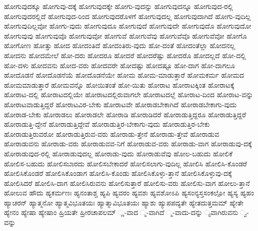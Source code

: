 {ಹೋಗುವುದಕ್ಕೂ
ಹೋಗುವು-ದಕ್ಕೆ
ಹೋಗುವುದಕ್ಕೇ
ಹೋಗು-ವುದನ್ನು
ಹೋಗುವುದನ್ನೂ
ಹೋಗುವುದ-ರಲ್ಲಿ
ಹೋಗುವುದರಲ್ಲಿದೆ
ಹೋಗುವುದ-ರಿಂದ
ಹೋಗುವುದರೊಳಗೆ
ಹೋಗುವುದಲ್ಲ
ಹೋಗುವುದಾಗಿದೆ
ಹೋಗು-ವುದಿಲ್ಲ
ಹೋಗುವುದಿಲ್ಲವೋ
ಹೋಗು-ವುದು
ಹೋಗುವುದೂ
ಹೋಗುವುದೆ
ಹೋಗುವುದೇ
ಹೋಗುವುದೊ
ಹೋಗುವುದೋ
ಹೋಗುವುವು
ಹೋಗುವುವೊ
ಹೋಗುವುವೋ
ಹೋಗುವೆ
ಹೋಗುವೆವು
ಹೋಗುವೆವೊ
ಹೋಗುವೆವೋ
ಹೋಗೊ
ಹೋಗೋಣ
ಹೋತ್ತು
ಹೋದ
ಹೋದಂತಿದೆ
ಹೋದಂತಿರು-ವುದು
ಹೋ-ದಂತೆ
ಹೋದಂತೆಲ್ಲಾ
ಹೋದನಲ್ಲ
ಹೋದನು
ಹೋದಮೇಲೆ
ಹೋ-ದರು
ಹೋದರೂ
ಹೋದರೆ
ಹೋದರೆಷ್ಟು
ಹೋದರೊ
ಹೋದಲ್ಲದೆ
ಹೋ-ದಲ್ಲಿ
ಹೋ-ದಳು
ಹೋದವನು
ಹೋದ-ವರು
ಹೋದವರೇ
ಹೋದಷ್ಟು
ಹೋದಷ್ಟೂ
ಹೋ-ದಾಗ
ಹೋ-ದಾಗಲೂ
ಹೋದೊಡನೆ
ಹೋದೊಡನೆಯೆ
ಹೋದೊಡನೆಯೇ
ಹೋಮ
ಹೋಮ-ಮಾಡುತ್ತಾರೆ
ಹೋಮಕರ್ಮ
ಹೋಮದ
ಹೋಮಮಾಡುತ್ತಾರೆ
ಹೋಮವನ್ನೊ
ಹೋಯಿತಂತೆ
ಹೋ-ಯಿತು
ಹೋರಾಟ
ಹೋರಾಟಕ್ಕಿಂತ
ಹೋರಾಟಕ್ಕೆ
ಹೋರಾಟ-ದಲ್ಲಿ
ಹೋರಾಟದಲ್ಲಿಯೇ
ಹೋರಾಟದಲ್ಲಿರುವಾಗಲೇ
ಹೋರಾಟದಲ್ಲೆ
ಹೋರಾಟ-ದಿಂದ
ಹೋರಾಟ-ವನ್ನು
ಹೋರಾಟವಾಡುತ್ತಿದ್ದರೆ
ಹೋರಾಟವಿರ-ಬೇಕು
ಹೋರಾಟವೇ
ಹೋರಾಡಬೇಕಾಗಿದೆ
ಹೋರಾಡಬೇಕಾಗು-ವುದು
ಹೋರಾಡ-ಬೇಕು
ಹೋರಾಡಲು
ಹೋರಾಡಲೇ
ಹೋರಾಡಿ
ಹೋರಾಡಿದರೆ
ಹೋರಾಡುತ್ತಿದ್ದರೂ
ಹೋರಾಡುತ್ತಿದ್ದರೆ
ಹೋರಾಡುತ್ತಿ-ದ್ದೇನೆ
ಹೋರಾಡುತ್ತಿದ್ದೇವೆ
ಹೋರಾಡುತ್ತಿರ-ಬೇಕಾಗು-ವುದು
ಹೋರಾಡುತ್ತಿರ-ಬೇಕು
ಹೋರಾಡುತ್ತಿರುವರೋ
ಹೋರಾಡುತ್ತಿರುವ-ವರು
ಹೋರಾಡು-ತ್ತೇನೆ
ಹೋರಾಡು-ತ್ತೇವೆ
ಹೋರಾಡುವ
ಹೋರಾಡುವನು
ಹೋರಾಡು-ವರು
ಹೋರಾಡುವವ-ನಿಗೆ
ಹೋರಾಡುವ-ವರು
ಹೋರಾಡು-ವಾಗ
ಹೋರಾಡುವು-ದಕ್ಕೆ
ಹೋರಾಡುವುದ-ರಲ್ಲಿ
ಹೋರಾಡುವುದಲ್ಲ
ಹೋರಾಡು-ವುದು
ಹೋರಾಡುವೆವು
ಹೋಲ-ಬಹುದು
ಹೋಲಿಕೆ
ಹೋಲಿಸ-ಬಹುದು
ಹೋಲಿಸಬಾರದು
ಹೋಲಿಸಬೇಕಾದರೆ
ಹೋಲಿಸಲಾಗು-ವುದಿಲ್ಲ
ಹೋಲಿಸಿ
ಹೋಲಿಸಿ-ಕೊಂಡರೆ
ಹೋಲಿಸಿಕೊಂಡರೆ
ಹೋಲಿಸಿಕೊಂಡಾಗ
ಹೋಲಿಸಿ-ಕೊಂಡು
ಹೋಲಿಸಿಕೊಳ್ಳು-ತ್ತಾನೆ
ಹೋಲಿಸಿಕೊಳ್ಳುವು-ದಕ್ಕೆ
ಹೋಲಿಸಿದರೆ
ಹೋಲಿಸಿ-ದಾಗ
ಹೋಲಿಸಿರುವನು
ಹೋಲಿಸುತ್ತಾರೆ
ಹೋಲಿಸು-ವರು
ಹೋಲಿಸು-ವಾಗ
ಹೋಲು-ತ್ತಾನೆ
ಹೋಲುವ
ಹೌದು
ಹ್ಯಕರ್ಮಣಃ
ಹ್ಯನಂತಾಶ್ಚ
ಹ್ಯಪಿ
ಹ್ಯವರಂ
ಹ್ಯವಶಃ
ಹ್ಯವಶೋಽಪಿ
ಹ್ಯಸಂನ್ಯಸ್ತಸಂಕಲ್ಪೋ
ಹ್ಯಸ್ಯ
ಹ್ಯಹಂ
ಹ್ಯಾಚರನ್
ಹ್ಯಾತ್ಮನೋ
ಹ್ಯಾತ್ಮವಿಭೂತಯಃ
ಹ್ಯಾತ್ಮಾವಿಭೂತಯಃ
ಹ್ಯಾಶು
ಹ್ಯುಪಪದ್ಯತೇ
ಹ್ಯೇತದುತ್ತಮಮ್
ಹ್ಯೇತೇ
ಹ್ಯೇನಂ
ಹ್ಯೇಷಾ
ಹ್ಯೇಷಾಂ
ಹ್ರಿಯತೇ
ಹ್ರೀರಚಾಪಲಮ್
್ಣ-ವಾದ
್ಮ-ವಾಗಿದೆ
್ಮ-ವಾದು-ದನ್ನು
್ಯವಾಗಿರುವನು
್ವ-ವನ್ನು
}
